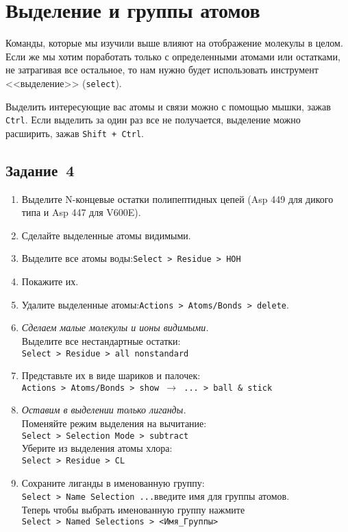 \section{Выделение и группы атомов}
Команды, которые мы изучили выше влияют на отображение молекулы в целом. Если же мы хотим поработать только с определенными атомами или остатками, не затрагивая все остальное, то нам нужно будет использовать инструмент <<выделение>> (\texttt{select}).

Выделить интересующие вас атомы и связи можно с помощью мышки, зажав \texttt{Ctrl}. Если выделить за один раз все не получается, выделение можно расширить, зажав \texttt{Shift + Ctrl}.

\subsection*{Задание~4}
\begin{enumerate}
    \item Выделите N-концевые остатки полипептидных цепей (Asp 449 для дикого типа и Asp 447 для V600E).
    
    \item Сделайте выделенные атомы видимыми.
    
    \item Выделите все атомы воды:\quad\texttt{Select > Residue > HOH}\quad
    
    \item Покажите их.
    
    \item Удалите выделенные атомы:\quad\texttt{Actions > Atoms/Bonds > delete}.
    
    \item \textit{Сделаем малые молекулы и ионы видимыми.}\\
    Выделите все нестандартные остатки:\\\texttt{Select > Residue > all nonstandard}
    
    \item Представьте их в виде шариков и палочек:\\\texttt{Actions > Atoms/Bonds >
    show $\rightarrow$ ... > ball \& stick}
    
    \item \textit{Оставим в выделении только лиганды.}\\
    Поменяйте режим выделения на вычитание:\\
    \texttt{Select > Selection Mode > subtract}\\
    Уберите из выделения атомы хлора:\\
    \texttt{Select > Residue > CL}
    
    \item \label{task:sel} Сохраните лиганды в именованную группу:\\
    \texttt{Select > Name Selection ...}\quad введите имя для группы атомов.\\
    Теперь чтобы выбрать именованную группу нажмите\\\texttt{Select > Named Selections > <Имя\_Группы>}
\end{enumerate}